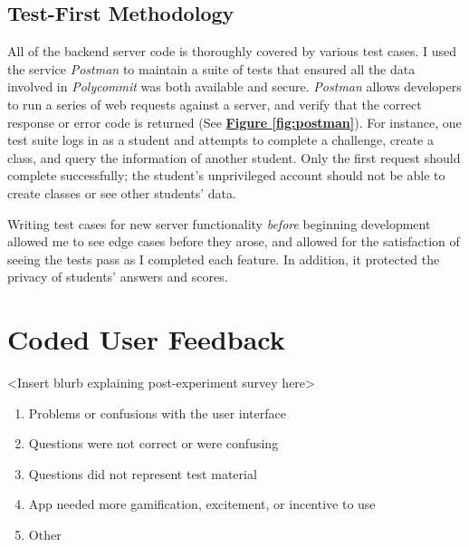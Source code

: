 \subsection{Test-First Methodology}
\par All of the backend server code is thoroughly covered by various test cases. I used the service \textit{Postman} to maintain a suite of tests that ensured all the data involved in \textit{Polycommit} was both available and secure. \textit{Postman} allows developers to run a series of web requests against a server, and verify that the correct response or error code is returned (See  \textbf{\hyperref[fig:polycommit5]{Figure \ref*{fig:postman}}}). For instance, one test suite logs in as a student and attempts to complete a challenge, create a class, and query the information of another student. Only the first request should complete successfully; the student's unprivileged account should not be able to create classes or see other students' data.

\par Writing test cases for new server functionality \textit{before} beginning development allowed me to see edge cases before they arose, and allowed for the satisfaction of seeing the tests pass as I completed each feature. In addition, it protected the privacy of students' answers and scores.

\section {Coded User Feedback}

<Insert blurb explaining post-experiment survey here>

\begin{enumerate}
	\item Problems or confusions with the user interface
	\item Questions were not correct or were confusing
	\item Questions did not represent test material
	\item App needed more gamification, excitement, or incentive to use
	\item Other
\end{enumerate}

